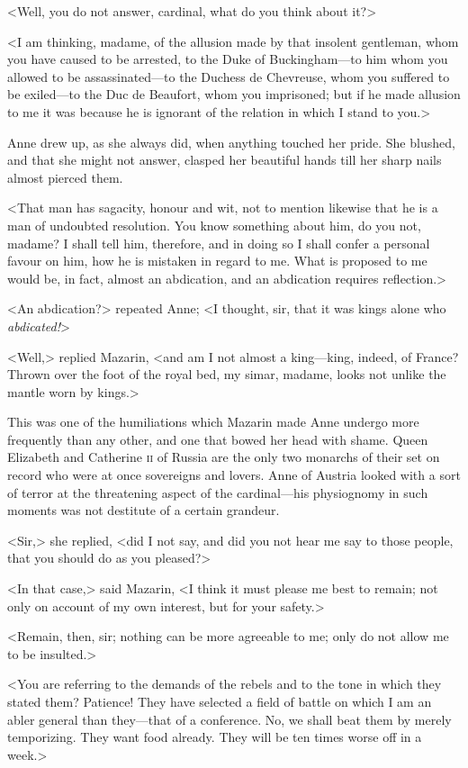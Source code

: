 <Well, you do not answer, cardinal, what do you think about it?>

<I am thinking, madame, of the allusion made by that insolent gentleman, whom you have caused to be arrested, to the Duke of Buckingham—to him whom you allowed to be assassinated—to the Duchess de Chevreuse, whom you suffered to be exiled—to the Duc de Beaufort, whom you imprisoned; but if he made allusion to me it was because he is ignorant of the relation in which I stand to you.>

Anne drew up, as she always did, when anything touched her pride. She blushed, and that she might not answer, clasped her beautiful hands till her sharp nails almost pierced them.

<That man has sagacity, honour and wit, not to mention likewise that he is a man of undoubted resolution. You know something about him, do you not, madame? I shall tell him, therefore, and in doing so I shall confer a personal favour on him, how he is mistaken in regard to me. What is proposed to me would be, in fact, almost an abdication, and an abdication requires reflection.>

<An abdication?> repeated Anne; <I thought, sir, that it was kings alone who \textit{abdicated!}>

<Well,> replied Mazarin, <and am I not almost a king—king, indeed, of France? Thrown over the foot of the royal bed, my simar, madame, looks not unlike the mantle worn by kings.>

This was one of the humiliations which Mazarin made Anne undergo more frequently than any other, and one that bowed her head with shame. Queen Elizabeth and Catherine \textsc{ii} of Russia are the only two monarchs of their set on record who were at once sovereigns and lovers. Anne of Austria looked with a sort of terror at the threatening aspect of the cardinal—his physiognomy in such moments was not destitute of a certain grandeur.

<Sir,> she replied, <did I not say, and did you not hear me say to those people, that you should do as you pleased?>

<In that case,> said Mazarin, <I think it must please me best to remain; not only on account of my own interest, but for your safety.>

<Remain, then, sir; nothing can be more agreeable to me; only do not allow me to be insulted.>

<You are referring to the demands of the rebels and to the tone in which they stated them? Patience! They have selected a field of battle on which I am an abler general than they—that of a conference. No, we shall beat them by merely temporizing. They want food already. They will be ten times worse off in a week.>

